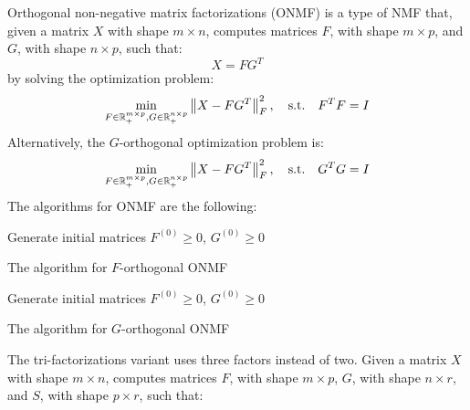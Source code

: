 Orthogonal non-negative matrix factorizations (ONMF) is a type of NMF that, given a matrix $X$ with shape $m \times n$, computes matrices $F$, with shape $m \times p$, and $G$, with shape $n \times p$, such that:
\begin{equation*}
X = FG^T
\end{equation*}
by solving the optimization problem:
\begin{equation*}
\min_{F \in \mathbb{R}^{m \times p}_+, G \in \mathbb{R}^{n \times p}_+} \left\lVert X - FG^T\right\rVert_F^2, \quad \text{s.t.} \quad F^TF = I
\end{equation*}
Alternatively, the $G$-orthogonal optimization problem is:
\begin{equation*}
\min_{F \in \mathbb{R}^{m \times p}_+, G \in \mathbb{R}^{n \times p}_+} \left\lVert X - FG^T\right\rVert_F^2, \quad \text{s.t.} \quad G^TG = I
\end{equation*}
The algorithms for ONMF are the following:
\vskip 0.7cm
\begin{algorithm}[H]
Generate initial matrices $F^{(0)} \geq 0$, $G^{(0)} \geq 0$\;
\caption{The algorithm for $F$-orthogonal ONMF}
\end{algorithm}
\vskip 0.7cm
\begin{algorithm}[H]
Generate initial matrices $F^{(0)} \geq 0$, $G^{(0)} \geq 0$\;
\caption{The algorithm for $G$-orthogonal ONMF}
\end{algorithm}
\vskip 0.7cm
The tri-factorizations \cite{10.1145/1150402.1150420} variant uses three factors instead of two. Given a matrix $X$ with shape $m \times n$, computes matrices $F$, with shape $m \times p$, $G$, with shape $n \times r$, and $S$, with shape $p \times r$, such that:
